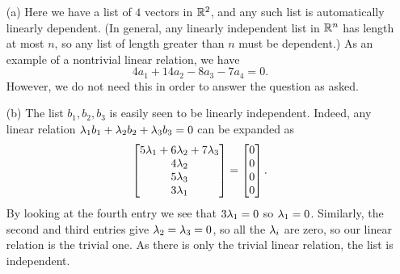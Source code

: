 \documentclass[a4paper]{amsart}
\renewenvironment{solution}{\SolutionInline}{\endSolutionInline}
\begin{document}
\begin{solution}
 \begin{itemize}
  \item[(a)] Here we have a list of $4$ vectors in ${\mathbb{R}}^2$, and any
   such list is automatically linearly dependent.  (In general, any
   linearly independent list in ${\mathbb{R}}^n$ has length at most $n$, so any
   list of length greater than $n$ must be dependent.)  As an example
   of a nontrivial linear relation, we have 
   \[ 4a_1 + 14a_2 - 8a_3 - 7a_4 = 0. \]
   However, we do not need this in order to answer the question as
   asked.
  \item[(b)] The list $b_1,b_2,b_3$ is easily seen to be linearly
   independent.  Indeed, any linear relation
   $\lambda_1b_1+\lambda_2b_2+\lambda_3b_3=0$ can be expanded as 
   \[ \left[\begin{matrix} 5\lambda_1+6\lambda_2+7\lambda_3 \\ 4\lambda_2 \\ 5\lambda_3 \\ 3\lambda_1 \end{matrix}\right]
        = \left[\begin{matrix} 0 \\ 0 \\ 0 \\ 0 \end{matrix}\right]. 
   \]
   By looking at the fourth entry we see that $3\lambda_1=0$ so
   $\lambda_1=0$.  Similarly, the second and third entries give
   $\lambda_2=\lambda_3=0$, so all the $\lambda_i$ are zero, so our linear
   relation is the trivial one.  As there is only the trivial linear
   relation, the list is independent.


\end{itemize}
\end{solution}
\end{document}
